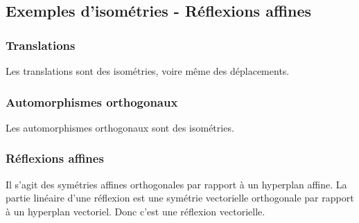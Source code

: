 \subsection{Exemples d'isométries - Réflexions affines}

\subsubsection{Translations}

Les translations sont des isométries, voire même des déplacements.

\subsubsection{Automorphismes orthogonaux}

Les automorphismes orthogonaux sont des isométries.

\subsubsection{Réflexions affines}

Il s'agit des symétries affines orthogonales par rapport à un hyperplan affine. La partie linéaire d'une réflexion est une symétrie vectorielle orthogonale par rapport à un hyperplan vectoriel. Donc c'est une réflexion vectorielle.

